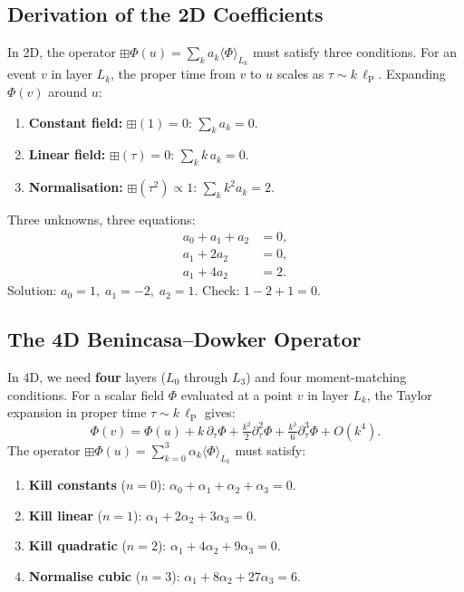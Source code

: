 \documentclass[11pt, a4paper, openany]{book}
\newcommand{\lP}{\ell_{\mathrm{P}}}
\newcommand{\boxlayer}{\boxplus}            %
\begin{document}
\subsection{Derivation of the 2D Coefficients}

In 2D, the operator $\boxlayer\Phi(u) = \sum_k a_k \langle\Phi\rangle_{L_k}$
must satisfy three conditions. For an event $v$ in layer $L_k$, the
proper time from $v$ to $u$ scales as $\tau \sim k\,\lP$. Expanding
$\Phi(v)$ around $u$:

\begin{enumerate}
  \item \textbf{Constant field:} $\boxlayer(1) = 0$: $\sum_k a_k = 0$.
  \item \textbf{Linear field:} $\boxlayer(\tau) = 0$: $\sum_k k\,a_k = 0$.
  \item \textbf{Normalisation:} $\boxlayer(\tau^2) \propto 1$:
    $\sum_k k^2 a_k = 2$.
\end{enumerate}

Three unknowns, three equations:
\begin{align}
  a_0 + a_1 + a_2 &= 0, \\
  a_1 + 2a_2 &= 0, \\
  a_1 + 4a_2 &= 2.
\end{align}
Solution: $a_0 = 1,\; a_1 = -2,\; a_2 = 1$. Check: $1 - 2 + 1 = 0$.

\subsection{The 4D Benincasa--Dowker Operator}

In 4D, we need \textbf{four} layers ($L_0$ through $L_3$) and four
moment-matching conditions. For a scalar field $\Phi$ evaluated at a
point $v$ in layer $L_k$, the Taylor expansion in proper time
$\tau \sim k\,\lP$ gives:
\[
  \Phi(v) = \Phi(u) + k\,\partial_\tau\Phi + \tfrac{k^2}{2}\partial_\tau^2\Phi
  + \tfrac{k^3}{6}\partial_\tau^3\Phi + O(k^4).
\]
The operator $\boxlayer\Phi(u) = \sum_{k=0}^{3}\alpha_k\langle\Phi\rangle_{L_k}$
must satisfy:

\begin{enumerate}
  \item \textbf{Kill constants} ($n=0$): $\alpha_0 + \alpha_1 + \alpha_2 + \alpha_3 = 0$.
  \item \textbf{Kill linear} ($n=1$): $\alpha_1 + 2\alpha_2 + 3\alpha_3 = 0$.
  \item \textbf{Kill quadratic} ($n=2$): $\alpha_1 + 4\alpha_2 + 9\alpha_3 = 0$.
  \item \textbf{Normalise cubic} ($n=3$): $\alpha_1 + 8\alpha_2 + 27\alpha_3 = 6$.
\end{enumerate}
\end{document}
